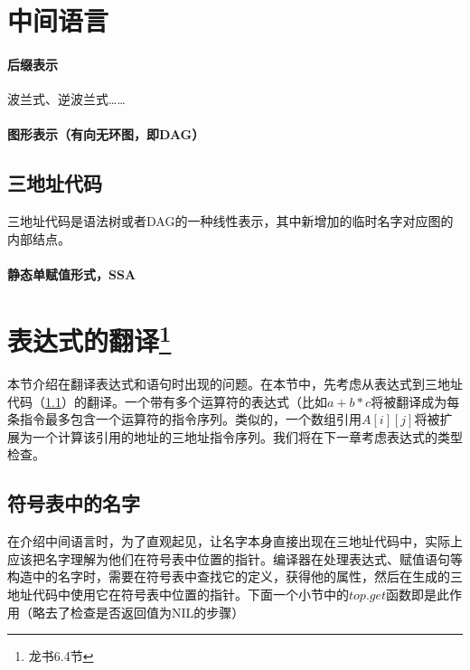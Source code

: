 \documentclass[]{report}
\begin{document}
	\section{中间语言}
		\paragraph{后缀表示}
		波兰式、逆波兰式……
		\paragraph{图形表示（有向无环图，即DAG）}
		\subsection{三地址代码}\label{paragraph:triple_code}
		三地址代码是语法树或者DAG的一种线性表示，其中新增加的临时名字对应图的内部结点。
		\paragraph{静态单赋值形式，SSA}
	\section[]{表达式的翻译\footnote{龙书6.4节}}
		本节介绍在翻译表达式和语句时出现的问题。在本节中，先考虑从表达式到三地址代码（\ref{paragraph:triple_code}）的翻译。一个带有多个运算符的表达式（比如$a+b*c$将被翻译成为每条指令最多包含一个运算符的指令序列。类似的，一个数组引用$A[i][j]$将被扩展为一个计算该引用的地址的三地址指令序列。我们将在下一章考虑表达式的类型检查。
		\subsection{符号表中的名字}
			在介绍中间语言时，为了直观起见，让名字本身直接出现在三地址代码中，实际上应该把名字理解为他们在符号表中位置的指针。编译器在处理表达式、赋值语句等构造中的名字时，需要在符号表中查找它的定义，获得他的属性，然后在生成的三地址代码中使用它在符号表中位置的指针。下面一个小节中的$top.get$函数即是此作用（略去了检查是否返回值为NIL的步骤）
\end{document}
